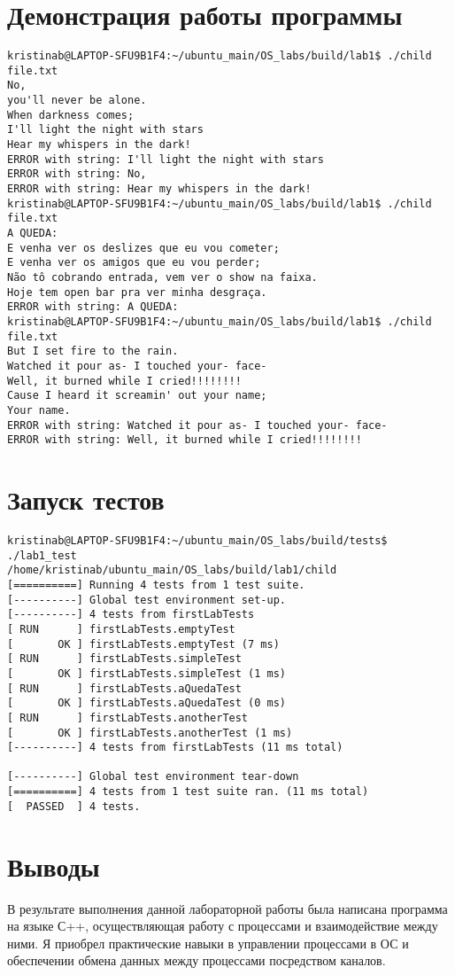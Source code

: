 \documentclass[a4paper, 12pt]{article}
\begin{document}
\newpage
\section{Демонстрация работы программы}

\begin{verbatim}
kristinab@LAPTOP-SFU9B1F4:~/ubuntu_main/OS_labs/build/lab1$ ./child file.txt
No,
you'll never be alone.
When darkness comes;
I'll light the night with stars
Hear my whispers in the dark!
ERROR with string: I'll light the night with stars
ERROR with string: No,
ERROR with string: Hear my whispers in the dark!
kristinab@LAPTOP-SFU9B1F4:~/ubuntu_main/OS_labs/build/lab1$ ./child file.txt
A QUEDA:
E venha ver os deslizes que eu vou cometer;
E venha ver os amigos que eu vou perder;
Não tô cobrando entrada, vem ver o show na faixa.
Hoje tem open bar pra ver minha desgraça.
ERROR with string: A QUEDA:
kristinab@LAPTOP-SFU9B1F4:~/ubuntu_main/OS_labs/build/lab1$ ./child file.txt
But I set fire to the rain.
Watched it pour as- I touched your- face-
Well, it burned while I cried!!!!!!!!
Cause I heard it screamin' out your name;
Your name.
ERROR with string: Watched it pour as- I touched your- face-
ERROR with string: Well, it burned while I cried!!!!!!!!
\end{verbatim}

\section{Запуск тестов}
\begin{verbatim}
kristinab@LAPTOP-SFU9B1F4:~/ubuntu_main/OS_labs/build/tests$ ./lab1_test
/home/kristinab/ubuntu_main/OS_labs/build/lab1/child
[==========] Running 4 tests from 1 test suite.
[----------] Global test environment set-up.
[----------] 4 tests from firstLabTests
[ RUN      ] firstLabTests.emptyTest
[       OK ] firstLabTests.emptyTest (7 ms)
[ RUN      ] firstLabTests.simpleTest
[       OK ] firstLabTests.simpleTest (1 ms)
[ RUN      ] firstLabTests.aQuedaTest
[       OK ] firstLabTests.aQuedaTest (0 ms)
[ RUN      ] firstLabTests.anotherTest
[       OK ] firstLabTests.anotherTest (1 ms)
[----------] 4 tests from firstLabTests (11 ms total)

[----------] Global test environment tear-down
[==========] 4 tests from 1 test suite ran. (11 ms total)
[  PASSED  ] 4 tests.
\end{verbatim}
\newpage
\section{Выводы}

В результате выполнения данной лабораторной работы была написана программа на языке С++, осуществляющая работу с процессами и 
взаимодействие между ними. Я приобрел практические навыки в управлении процессами в ОС и обеспечении обмена данных между процессами посредством каналов.
\end{document}
